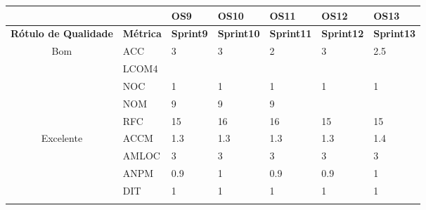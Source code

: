\begin{table}[H]
\begin{tabular}{|c|l|l|l|l|l|l|}
\hline
\multicolumn{1}{|l|}{\textbf{}}                    & \textbf{}        & \textbf{OS9}      & \textbf{OS10}      & \textbf{OS11}      & \textbf{OS12}      & \textbf{OS13}      \\ \hline
\multicolumn{1}{|l|}{\textbf{Rótulo de Qualidade}} & \textbf{Métrica} & \textbf{Sprint9} & \textbf{Sprint10} & \textbf{Sprint11} & \textbf{Sprint12} & \textbf{Sprint13} \\ \hline
\multirow{5}{*}{Bom}                               & ACC              & 3                 & 3                  & 2                  & 3                  & 2.5                \\ \cline{2-7} 
                                                   & LCOM4            &                   &                    &                    &                    &                    \\ \cline{2-7} 
                                                   & NOC              & 1                 & 1                  & 1                  & 1                  & 1                  \\ \cline{2-7} 
                                                   & NOM              & 9                 & 9                  & 9                  &                    &                    \\ \cline{2-7} 
                                                   & RFC              & 15                & 16                 & 16                 & 15                 & 15                 \\ \hline
\multirow{7}{*}{Excelente}                         & ACCM             & 1.3               & 1.3                & 1.3                & 1.3                & 1.4                \\ \cline{2-7} 
                                                   & AMLOC            & 3                 & 3                  & 3                  & 3                  & 3                  \\ \cline{2-7} 
                                                   & ANPM             & 0.9               & 1                  & 0.9                & 0.9                & 1                  \\ \cline{2-7} 
                                                   & DIT              & 1                 & 1                  & 1                  & 1                  & 1                  \\ \cline{2-7} 

\end{tabular}
\end{table}
